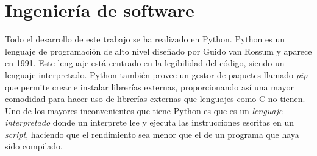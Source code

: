 \chapter{Ingeniería de software}
\label{sec:sftw}
Todo el desarrollo de este trabajo se ha realizado en Python. Python es un lenguaje de programación de alto nivel diseñado por Guido van Rossum y aparece en 1991. Este lenguaje está centrado en la legibilidad del código, siendo un lenguaje interpretado. \linebreak
Python también provee un gestor de paquetes llamado \textit{pip} que permite crear e instalar librerías externas, proporcionando así una mayor comodidad para hacer uso de librerías externas que lenguajes como C no tienen. \\
\linebreak
Uno de los mayores inconvenientes que tiene Python es que es un \textit{lenguaje interpretado} donde un interprete lee y ejecuta las instrucciones escritas en un \textit{script}, haciendo que el rendimiento sea menor que el de un programa que haya sido compilado.\\
\linebreak
